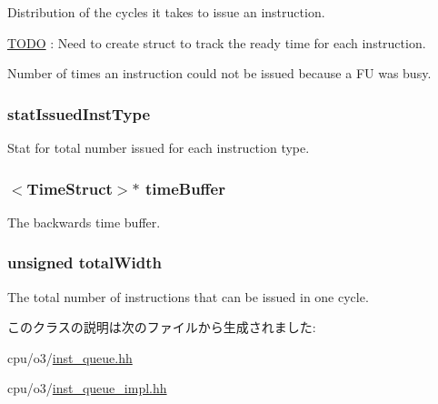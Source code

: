 \label{classInstructionQueue_a92266bfdbc9a6de5005fc3f1654e0b3e}
Distribution of the cycles it takes to issue an instruction. \begin{Desc}
\item[\hyperlink{todo__todo000034}{TODO}]: Need to create struct to track the ready time for each instruction. \end{Desc}
Number of times an instruction could not be issued because a FU was busy. \hypertarget{classInstructionQueue_abb8998de49604769ec252fbd0ac1ed2b}{
\subsubsection[{statIssuedInstType}]{ {\bf statIssuedInstType}}}
\label{classInstructionQueue_abb8998de49604769ec252fbd0ac1ed2b}
Stat for total number issued for each instruction type. \hypertarget{classInstructionQueue_a83f9ee976e732665aeb08dbc19acfd45}{
\subsubsection[{timeBuffer}]{$<${\bf TimeStruct}$>$$\ast$ {\bf timeBuffer}}}
\label{classInstructionQueue_a83f9ee976e732665aeb08dbc19acfd45}
The backwards time buffer. \hypertarget{classInstructionQueue_ab3c3a8cd00248d9cd6acad330da902a7}{
\subsubsection[{totalWidth}]{\setlength{\rightskip}{0pt plus 5cm}unsigned {\bf totalWidth}}}
\label{classInstructionQueue_ab3c3a8cd00248d9cd6acad330da902a7}
The total number of instructions that can be issued in one cycle. 

このクラスの説明は次のファイルから生成されました:\begin{DoxyCompactItemize}
\item 
cpu/o3/\hyperlink{o3_2inst__queue_8hh}{inst\_\-queue.hh}\item 
cpu/o3/\hyperlink{o3_2inst__queue__impl_8hh}{inst\_\-queue\_\-impl.hh}\end{DoxyCompactItemize}
